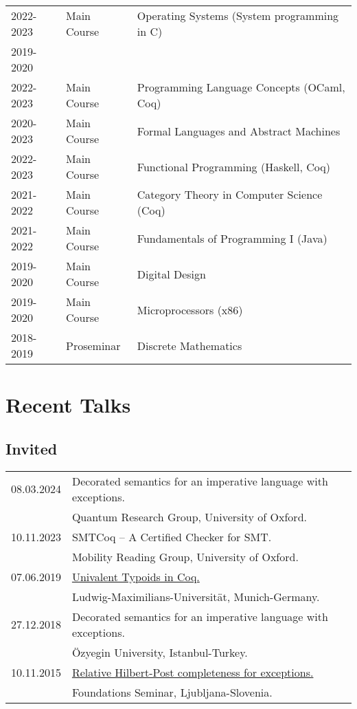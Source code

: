 \documentclass[a4paper,9pt]{article} %
\begin{document}
\begin{longtable}{lll}	
2022-2023 & Main Course & Operating Systems (System programming in C)
\\[0.15cm]
2019-2020 & \\
2022-2023 & Main Course & Programming Language Concepts (OCaml, Coq)
\\[0.15cm]
2020-2023 & Main Course & Formal Languages and Abstract Machines  
\\[0.15cm]
2022-2023 & Main Course & Functional Programming (Haskell, Coq)  
\\[0.15cm]
2021-2022 & Main Course & Category Theory in Computer Science  (Coq)
\\[0.15cm]
2021-2022 & Main Course & Fundamentals of Programming I (Java)
\\[0.15cm]
2019-2020 & Main Course & Digital Design 
\\[0.15cm]
2019-2020 & Main Course & Microprocessors (x86)
\\[0.15cm]
2018-2019 & Proseminar & Discrete Mathematics
\end{longtable}


\section*{Recent Talks}
{\vskip4mm}
\subsection*{Invited}

\begin{longtable}{ll}	

{\normalsize 08.03.2024} & {Decorated semantics for an imperative language with exceptions.} \\
& Quantum Research Group, University of Oxford.\\[0.25cm]
{\normalsize 10.11.2023} &{SMTCoq -- A Certified Checker for SMT.}\\
& Mobility Reading Group, University of Oxford.\\[0.25cm]
{\normalsize 07.06.2019}& \href{http://cj-xu.github.io/tim19/index.html}{Univalent Typoids in Coq.} \\
& Ludwig-Maximilians-Universität, Munich-Germany.\\[0.25cm]
{\normalsize 27.12.2018}& {Decorated semantics for an imperative language with exceptions.} \\
& Özyegin University, Istanbul-Turkey.\\[0.25cm]
{\normalsize10.11.2015} &\href{http://www.fmf.uni-lj.si/si/obvestila/35243/}{Relative Hilbert-Post completeness for exceptions.} \\
& Foundations Seminar, Ljubljana-Slovenia.
\end{longtable}
\end{document}
